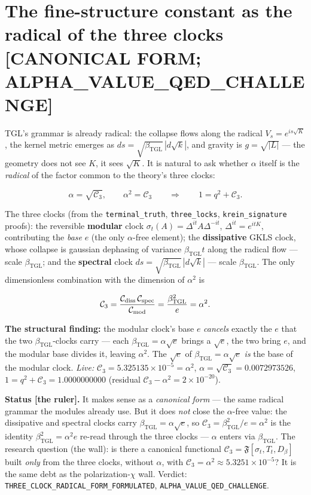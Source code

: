 \documentclass[11pt]{article}
\newcommand{\bTGL}{\beta_{\mathrm{TGL}}}\newcommand{\Msun}{M_{\odot}}\newcommand{\TGL}{\mathrm{TGL}}
\theoremstyle{definition}\newtheorem{deriv}{Derivation}
\begin{document}
\section{The fine-structure constant as the radical of the three clocks \textsf{[CANONICAL FORM; ALPHA\_VALUE\_QED\_CHALLENGE]}}

TGL's grammar is already radical: the collapse flows along the radical $V_s=e^{is\sqrt K}$, the kernel metric emerges as $ds=\sqrt{\bTGL}\,|d\sqrt k|$, and gravity is $g=\sqrt{|L|}$ --- the geometry does not see $K$, it sees $\sqrt K$. It is natural to ask whether $\alpha$ itself is the \emph{radical} of the factor common to the theory's three clocks:

\begin{equation} \alpha=\sqrt{\mathcal C_3},\qquad \alpha^2=\mathcal C_3 \qquad\Longrightarrow\qquad 1=q^2+\mathcal C_3.\end{equation}

The three clocks (from the \texttt{terminal\_truth}, \texttt{three\_locks}, \texttt{krein\_signature} proofs): the reversible \textbf{modular} clock $\sigma_t(A)=\Delta^{it}A\Delta^{-it}$, $\Delta^{it}=e^{itK}$, contributing the \emph{base} $e$ (the only $\alpha$-free element); the \textbf{dissipative} GKLS clock, whose collapse is gaussian dephasing of variance $\bTGL t$ along the radical flow --- scale $\bTGL$; and the \textbf{spectral} clock $ds=\sqrt{\bTGL}\,|d\sqrt k|$ --- scale $\bTGL$. The only dimensionless combination with the dimension of $\alpha^2$ is

\begin{equation} \mathcal C_3=\frac{\mathcal C_{\rm diss}\,\mathcal C_{\rm spec}}{\mathcal C_{\rm mod}}=\frac{\bTGL^2}{e}=\alpha^2.\end{equation}

\textbf{The structural finding:} the modular clock's base $e$ \emph{cancels} exactly the $e$ that the two $\bTGL$-clocks carry --- each $\bTGL=\alpha\sqrt e$ brings a $\sqrt e$, the two bring $e$, and the modular base divides it, leaving $\alpha^2$. The $\sqrt e$ of $\bTGL=\alpha\sqrt e$ \emph{is} the base of the modular clock. \emph{Live:} $\mathcal C_3=5.325135\times10^{-5}=\alpha^2$, $\alpha=\sqrt{\mathcal C_3}=0.0072973526$, $1=q^2+\mathcal C_3=1.0000000000$ (residual $\mathcal C_3-\alpha^2=2\times10^{-20}$).

\textbf{Status \textsf{[the ruler]}.} It makes sense as a \emph{canonical form} --- the same radical grammar the modules already use. But it does \emph{not} close the $\alpha$-free value: the dissipative and spectral clocks carry $\bTGL=\alpha\sqrt e$, so $\mathcal C_3=\bTGL^2/e=\alpha^2$ is the identity $\bTGL^2=\alpha^2 e$ re-read through the three clocks --- $\alpha$ enters via $\bTGL$. The research question (the wall): is there a canonical functional $\mathcal C_3=\mathfrak F[\sigma_t,T_t,D_\beta]$ built \emph{only} from the three clocks, without $\alpha$, with $\mathcal C_3=\alpha^2\approx5.3251\times10^{-5}$? It is the same debt as the polarization-$\chi$ wall. Verdict: \texttt{THREE\_CLOCK\_RADICAL\_FORM\_FORMULATED}, \texttt{ALPHA\_VALUE\_QED\_CHALLENGE}.
\end{document}
